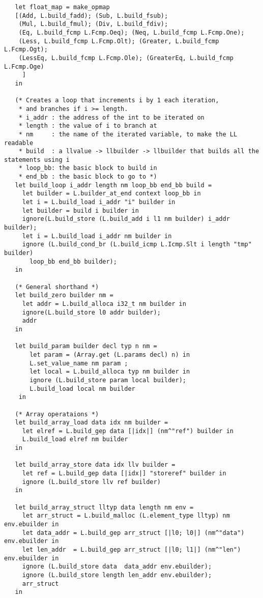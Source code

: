 \documentclass[main.tex]{subfiles}
\begin{document}
\begin{lstlisting}
   let float_map = make_opmap
   [(Add, L.build_fadd); (Sub, L.build_fsub);
    (Mul, L.build_fmul); (Div, L.build_fdiv);
    (Eq, L.build_fcmp L.Fcmp.Oeq); (Neq, L.build_fcmp L.Fcmp.One);
    (Less, L.build_fcmp L.Fcmp.Olt); (Greater, L.build_fcmp L.Fcmp.Ogt);
    (LessEq, L.build_fcmp L.Fcmp.Ole); (GreaterEq, L.build_fcmp L.Fcmp.Oge)
     ]
   in

   (* Creates a loop that increments i by 1 each iteration,
    * and branches if i >= length. 
    * i_addr : the address of the int to be iterated on
    * length : the value of i to branch at
    * nm     : the name of the iterated variable, to make the LL readable
    * build  : a llvalue -> llbuilder -> llbuilder that builds all the statements using i
    * loop_bb: the basic block to build in
    * end_bb : the basic block to go to *)
   let build_loop i_addr length nm loop_bb end_bb build = 
     let builder = L.builder_at_end context loop_bb in
     let i = L.build_load i_addr "i" builder in
     let builder = build i builder in
     ignore(L.build_store (L.build_add i l1 nm builder) i_addr builder);
     let i = L.build_load i_addr nm builder in
     ignore (L.build_cond_br (L.build_icmp L.Icmp.Slt i length "tmp" builder)
       loop_bb end_bb builder);
   in

   (* General shorthand *)
   let build_zero builder nm = 
     let addr = L.build_alloca i32_t nm builder in
     ignore(L.build_store l0 addr builder);
     addr
   in
   
   let build_param builder decl typ n nm =
       let param = (Array.get (L.params decl) n) in
       L.set_value_name nm param ;
       let local = L.build_alloca typ nm builder in
       ignore (L.build_store param local builder);
       L.build_load local nm builder
    in

   (* Array operataions *)
   let build_array_load data idx nm builder =
     let elref = L.build_gep data [|idx|] (nm^"ref") builder in
     L.build_load elref nm builder
   in

   let build_array_store data idx llv builder = 
     let ref = L.build_gep data [|idx|] "storeref" builder in
     ignore (L.build_store llv ref builder)
   in

   let build_array_struct lltyp data length nm env = 
     let arr_struct = L.build_malloc (L.element_type lltyp) nm env.ebuilder in
     let data_addr = L.build_gep arr_struct [|l0; l0|] (nm^"data") env.ebuilder in
     let len_addr  = L.build_gep arr_struct [|l0; l1|] (nm^"len")  env.ebuilder in
     ignore (L.build_store data  data_addr env.ebuilder);
     ignore (L.build_store length len_addr env.ebuilder);
     arr_struct
   in


\end{lstlisting}
\end{document}
